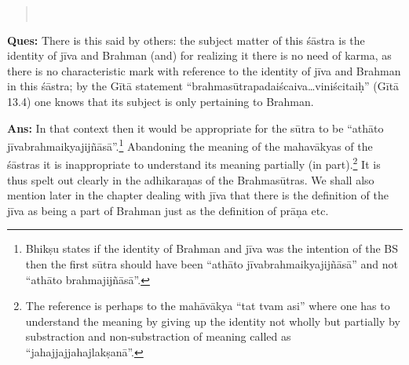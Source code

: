 \begin{verse}
\\
\end{verse}


\eject

\textbf{Ques:} There is this said by others: the subject matter of this śāstra is the identity of jīva and Brahman (and) for realizing it there is no need of karma, as there is no characteristic mark with reference to the identity of jīva and Brahman in this śāstra; by the Gītā statement “brahmasūtrapadaiścaiva…viniścitaiḥ” (Gītā 13.4)  one knows that its subject is only pertaining to Brahman.

\textbf{Ans:} In that context then it would be appropriate for the sūtra to be “athāto jīvabrahmaikyajijñāsā”.\footnote{Bhikṣu states if the identity of Brahman and jīva was the intention of the BS then the first sūtra should have been “athāto jīvabrahmaikyajijñāsā” and not “athāto brahmajijñāsā”.} Abandoning the meaning of the mahavākyas of the śāstras it is inappropriate to understand its meaning partially (in part).\footnote{The reference is perhaps to the mahāvākya “tat tvam asi” where one has to understand the meaning by giving up the identity not wholly but partially by substraction and non-substraction of meaning called as “jahajjajjahajlakṣanā”.} It is thus spelt out clearly in the adhikaraṇas of the Brahmasūtras. We shall also mention later in the chapter dealing with jīva that there is the definition of the jīva as being a part of Brahman just as the definition of prāṇa etc.

